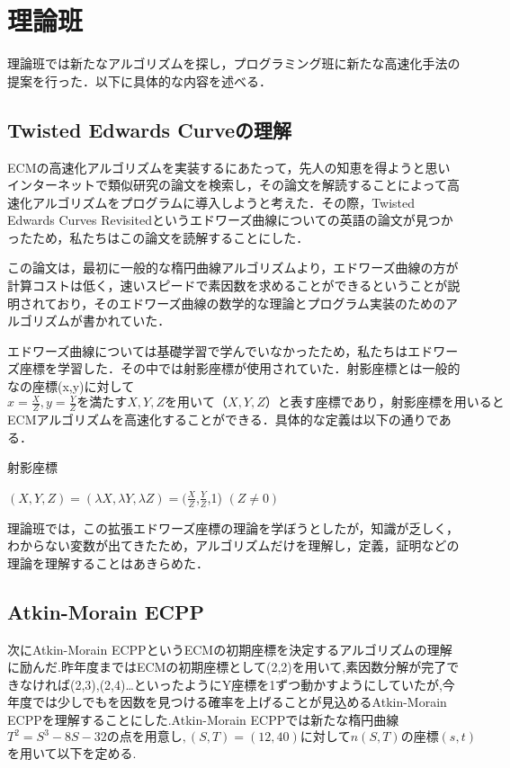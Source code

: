 \documentclass[openany,11pt,papersize]{jsbook}
\begin{document}

\section{理論班}
理論班では新たなアルゴリズムを探し，プログラミング班に新たな高速化手法の提案を行った．以下に具体的な内容を述べる．

\subsection{Twisted Edwards Curveの理解}
ECMの高速化アルゴリズムを実装するにあたって，先人の知恵を得ようと思いインターネットで類似研究の論文を検索し，その論文を解読することによって高速化アルゴリズムをプログラムに導入しようと考えた．その際，Twisted Edwards Curves Revisitedというエドワーズ曲線についての英語の論文が見つかったため，私たちはこの論文を読解することにした．

この論文は，最初に一般的な楕円曲線アルゴリズムより，エドワーズ曲線の方が計算コストは低く，速いスピードで素因数を求めることができるということが説明されており，そのエドワーズ曲線の数学的な理論とプログラム実装のためのアルゴリズムが書かれていた．

エドワーズ曲線については基礎学習で学んでいなかったため，私たちはエドワーズ座標を学習した．その中では射影座標が使用されていた．射影座標とは一般的なの座標(x,y)に対して$x=\frac{X}{Z},y=\frac{Y}{Z}を満たすX,Y,Zを用いて（X,Y,Z）と表す座標であり，射影座標を用いると$ECMアルゴリズムを高速化することができる．具体的な定義は以下の通りである．

\begin{itembox}[l]{射影座標}
\begin{center}
$(X,Y,Z)=(\lambda X, \lambda Y, \lambda Z)=$$(\displaystyle \frac{X}{Z}$,$\displaystyle \frac{Y}{Z}$,1) $(Z\neq0)$
\end{center}
\end{itembox}

理論班では，この拡張エドワーズ座標の理論を学ぼうとしたが，知識が乏しく，わからない変数が出てきたため，アルゴリズムだけを理解し，定義，証明などの理論を理解することはあきらめた．


\subsection{Atkin-Morain ECPP}
次にAtkin-Morain ECPPというECMの初期座標を決定するアルゴリズムの理解に励んだ.昨年度まではECMの初期座標として(2,2)を用いて,素因数分解が完了できなければ(2,3),(2,4)…といったようにY座標を1ずつ動かすようにしていたが,今年度では少しでもを因数を見つける確率を上げることが見込めるAtkin-Morain ECPPを理解することにした.Atkin-Morain ECPPでは新たな楕円曲線$T^2=S^3-8S-32の点を用意し,(S,T)=(12,40)に対してn(S,T)の座標(s,t)$を用いて以下を定める.
\end{document}

